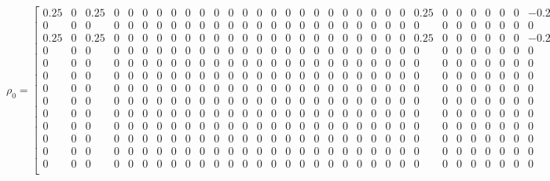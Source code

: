 \documentclass[11pt, a4paper]{article}
\begin{document}
\begin{sloppypar}
    \FloatBarrier
    \begin{figure}[ht]
      \centering
      \setcounter{MaxMatrixCols}{33}
      \[
        \rho_{0}= \left[
        \begin{smallmatrix}
          0.25  & 0 & 0.25  & 0 & 0 & 0 & 0 & 0 & 0 & 0 & 0 & 0 & 0 & 0 & 0 & 0 & 0 & 0 & 0 & 0 & 0 & 0 & 0 & 0 & 0.25  & 0 & 0 & 0 & 0 & 0 & 0 & -0.25 \\
          0     & 0 & 0     & 0 & 0 & 0 & 0 & 0 & 0 & 0 & 0 & 0 & 0 & 0 & 0 & 0 & 0 & 0 & 0 & 0 & 0 & 0 & 0 & 0 & 0     & 0 & 0 & 0 & 0 & 0 & 0 & 0     \\
          0.25  & 0 & 0.25  & 0 & 0 & 0 & 0 & 0 & 0 & 0 & 0 & 0 & 0 & 0 & 0 & 0 & 0 & 0 & 0 & 0 & 0 & 0 & 0 & 0 & 0.25  & 0 & 0 & 0 & 0 & 0 & 0 & -0.25 \\
          0     & 0 & 0     & 0 & 0 & 0 & 0 & 0 & 0 & 0 & 0 & 0 & 0 & 0 & 0 & 0 & 0 & 0 & 0 & 0 & 0 & 0 & 0 & 0 & 0     & 0 & 0 & 0 & 0 & 0 & 0 & 0     \\
          0     & 0 & 0     & 0 & 0 & 0 & 0 & 0 & 0 & 0 & 0 & 0 & 0 & 0 & 0 & 0 & 0 & 0 & 0 & 0 & 0 & 0 & 0 & 0 & 0     & 0 & 0 & 0 & 0 & 0 & 0 & 0     \\
          0     & 0 & 0     & 0 & 0 & 0 & 0 & 0 & 0 & 0 & 0 & 0 & 0 & 0 & 0 & 0 & 0 & 0 & 0 & 0 & 0 & 0 & 0 & 0 & 0     & 0 & 0 & 0 & 0 & 0 & 0 & 0     \\
          0     & 0 & 0     & 0 & 0 & 0 & 0 & 0 & 0 & 0 & 0 & 0 & 0 & 0 & 0 & 0 & 0 & 0 & 0 & 0 & 0 & 0 & 0 & 0 & 0     & 0 & 0 & 0 & 0 & 0 & 0 & 0     \\
          0     & 0 & 0     & 0 & 0 & 0 & 0 & 0 & 0 & 0 & 0 & 0 & 0 & 0 & 0 & 0 & 0 & 0 & 0 & 0 & 0 & 0 & 0 & 0 & 0     & 0 & 0 & 0 & 0 & 0 & 0 & 0     \\
          0     & 0 & 0     & 0 & 0 & 0 & 0 & 0 & 0 & 0 & 0 & 0 & 0 & 0 & 0 & 0 & 0 & 0 & 0 & 0 & 0 & 0 & 0 & 0 & 0     & 0 & 0 & 0 & 0 & 0 & 0 & 0     \\
          0     & 0 & 0     & 0 & 0 & 0 & 0 & 0 & 0 & 0 & 0 & 0 & 0 & 0 & 0 & 0 & 0 & 0 & 0 & 0 & 0 & 0 & 0 & 0 & 0     & 0 & 0 & 0 & 0 & 0 & 0 & 0     \\
          0     & 0 & 0     & 0 & 0 & 0 & 0 & 0 & 0 & 0 & 0 & 0 & 0 & 0 & 0 & 0 & 0 & 0 & 0 & 0 & 0 & 0 & 0 & 0 & 0     & 0 & 0 & 0 & 0 & 0 & 0 & 0     \\
          0     & 0 & 0     & 0 & 0 & 0 & 0 & 0 & 0 & 0 & 0 & 0 & 0 & 0 & 0 & 0 & 0 & 0 & 0 & 0 & 0 & 0 & 0 & 0 & 0     & 0 & 0 & 0 & 0 & 0 & 0 & 0     \\
          0     & 0 & 0     & 0 & 0 & 0 & 0 & 0 & 0 & 0 & 0 & 0 & 0 & 0 & 0 & 0 & 0 & 0 & 0 & 0 & 0 & 0 & 0 & 0 & 0     & 0 & 0 & 0 & 0 & 0 & 0 & 0     \\

\end{smallmatrix}\]
\end{figure}
\end{sloppypar}
\end{document}
